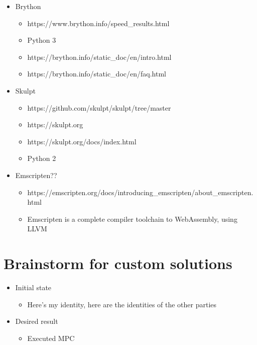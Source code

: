 \begin{itemize}
\tightlist
\item
  Brython

  \begin{itemize}
  \tightlist
  \item
    https://www.brython.info/speed\_results.html
  \item
    Python 3
  \item
    https://brython.info/static\_doc/en/intro.html
  \item
    https://brython.info/static\_doc/en/faq.html
  \end{itemize}
\item
  Skulpt

  \begin{itemize}
  \tightlist
  \item
    https://github.com/skulpt/skulpt/tree/master
  \item
    https://skulpt.org
  \item
    https://skulpt.org/docs/index.html
  \item
    Python 2
  \end{itemize}
\item
  Emscripten??

  \begin{itemize}
  \tightlist
  \item
    https://emscripten.org/docs/introducing\_emscripten/about\_emscripten.html
  \item
    Emscripten is a complete compiler toolchain to WebAssembly, using
    LLVM
  \end{itemize}
\end{itemize}

\hypertarget{brainstorm-for-custom-solutions}{%
\chapter{Brainstorm for custom
solutions}\label{brainstorm-for-custom-solutions}}

\begin{itemize}
\tightlist
\item
  Initial state

  \begin{itemize}
  \tightlist
  \item
    Here's my identity, here are the identities of the other parties
  \end{itemize}
\item
  Desired result

  \begin{itemize}
  \tightlist
  \item
    Executed MPC
  \end{itemize}
\end{itemize}

